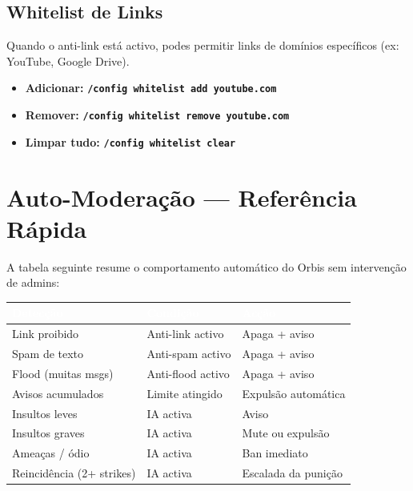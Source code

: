 \documentclass[12pt,a4paper]{article}
\newcommand{\cmd}[1]{\texttt{\textcolor{orbisblue}{\textbf{#1}}}}
\begin{document}
\subsection{Whitelist de Links}

Quando o anti-link está activo, podes permitir links de domínios específicos (ex: YouTube, Google Drive).

\begin{itemize}[leftmargin=1.5em, itemsep=2pt]
  \item \textbf{Adicionar:} \cmd{/config whitelist add youtube.com}
  \item \textbf{Remover:} \cmd{/config whitelist remove youtube.com}
  \item \textbf{Limpar tudo:} \cmd{/config whitelist clear}
\end{itemize}

\section{Auto-Moderação — Referência Rápida}
\label{sec:automod}

A tabela seguinte resume o comportamento automático do Orbis sem intervenção de admins:

\begin{center}
\begin{longtable}{L{3.5cm} L{3.5cm} L{6cm}}
\toprule
{}\textcolor{white}{\textbf{Detecção}} & \textcolor{white}{\textbf{Condição}} & \textcolor{white}{\textbf{Acção}} \\
\midrule
\endhead
Link proibido & Anti-link activo & Apaga + aviso \\
Spam de texto & Anti-spam activo & Apaga + aviso \\
Flood (muitas msgs) & Anti-flood activo & Apaga + aviso \\
Avisos acumulados & Limite atingido & Expulsão automática \\
Insultos leves & IA activa & Aviso \\
Insultos graves & IA activa & Mute ou expulsão \\
Ameaças / ódio & IA activa & Ban imediato \\
Reincidência (2+ strikes) & IA activa & Escalada da punição \\
\bottomrule
\end{longtable}
\end{center}
\end{document}
